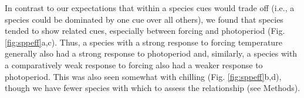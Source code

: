 \documentclass[11pt]{article}
\begin{document}
In contrast to our expectations that within a species cues would trade off (i.e., a species could be dominated by one cue over all others), we found that species tended to show related cues, especially between forcing and photoperiod (Fig. \ref{fig:sppeff}a,c). Thus, a species with a strong response to forcing temperature generally also had a strong response to photoperiod and, similarly, a species with a comparatively weak response to forcing also had a weaker response to photoperiod. This was also seen somewhat with chilling (Fig. \ref{fig:sppeff}b,d), though we have fewer species with which to assess the relationship (see Methods). 
\end{document}
